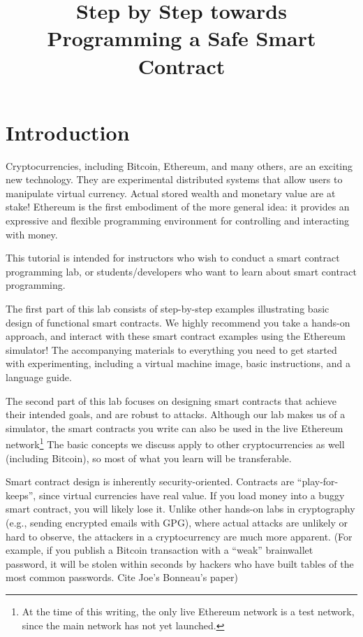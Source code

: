 \documentclass[10pt,twocolumn,letterpaper]{article}
\newcommand{\elaine}[1]{{\color{red}{[elaine: #1]}}}
\begin{document}
\title{Step by Step towards Programming a Safe Smart Contract}

\date{}
\maketitle


\newpage
\section{Introduction}

\elaine{rewrite}

Cryptocurrencies, including Bitcoin, Ethereum, and many others, are an exciting new technology. They are experimental distributed systems that allow users to manipulate virtual currency. Actual stored wealth and monetary value are at stake! Ethereum is the first embodiment of the more general idea: it provides an expressive and flexible programming environment for controlling and interacting with money.

This tutorial is intended for instructors
who wish to conduct a smart  
contract programming lab, or students/developers
who want to learn about smart contract programming.

The first part of this lab consists of step-by-step examples illustrating basic design of functional smart contracts. We highly recommend you take a hands-on approach, and interact with these smart contract examples using the Ethereum simulator! The accompanying materials to everything you need to get started with experimenting, including  a virtual machine image, basic instructions, and a language guide.

The second part of this lab focuses on designing smart contracts that achieve their intended goals, and are robust to attacks. 
Although our lab makes us of a simulator, the smart contracts you write can also be used in the live Ethereum network\footnote{At the time of this writing, the only live Ethereum network is a test network, since the main network has not yet launched.} The basic concepts we discuss apply to other cryptocurrencies as well (including Bitcoin), so most of what you learn will be transferable.

Smart contract design is inherently security-oriented. Contracts are ``play-for-keeps”, since virtual currencies have real value. If you load money into a buggy smart contract, you will likely lose it. Unlike other hands-on labs in cryptography (e.g., sending encrypted emails with GPG), where actual attacks are unlikely or hard to observe, the attackers in a cryptocurrency are much more apparent. (For example, if you publish a Bitcoin transaction with a “weak” brainwallet password, it will be stolen within seconds by hackers who have built tables of the most common passwords. Cite Joe’s Bonneau’s paper)
\end{document}

